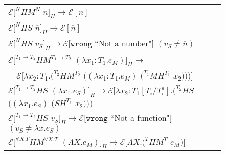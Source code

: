 \begin{figure}[p]
\centering
\begin{tabular}{l}
\vspace{5pt}

$\mathscr{E}[^{N}HM^{N}$ $\overline{n}]_{H}\rightarrow\mathscr{E}[\overline{n}]$ \\

\vspace{5pt}

$\mathscr{E}[^{N}HS$ $\overline{n}]_{H}\rightarrow\mathscr{E}[\overline{n}]$ \\

\vspace{5pt}

$\mathscr{E}[^{N}HS$ $v_{S}]_{H}\rightarrow\mathscr{E}[\mathtt{wrong}$ ``Not a number"$]$ $(v_{S}\neq\overline{n})$ \\

\vspace{5pt}

$\mathscr{E}[^{T_{1}\rightarrow T_{2}}HM^{T_{1}\rightarrow T_{2}}$ $(\lambda x_{1}:T_{1}.e_{M})]_{H}\rightarrow$ \\

\vspace{5pt}

$\quad\mathscr{E}[\lambda x_{2}:T_{1}.(^{T_{2}}HM^{T_{2}}$ $((\lambda x_{1}:T_{1}.e_{M})$ $(^{T_{1}}MH^{T_{1}}$ $x_{2})))]$ \\

\vspace{5pt}

$\mathscr{E}[^{T_{1}\rightarrow T_{2}}HS$ $(\lambda x_{1}.e_{S})]_{H}\rightarrow\mathscr{E}[\lambda x_{2}:T_{1}[T_{i}/T^{a}_{i}].(^{T_{2}}HS$ $((\lambda x_{1}.e_{S})$ $(SH^{T_{1}}$ $x_{2})))]$ \\

\vspace{5pt}

$\mathscr{E}[^{T_{1}\rightarrow T_{2}}HS$ $v_{S}]_{H}\rightarrow\mathscr{E}[\mathtt{wrong}$ ``Not a function"$]$ $(v_{S}\neq\lambda x.e_{S})$ \\

\vspace{5pt}

$\mathscr{E}[^{\forall X.T}HM^{\forall X.T}$ $(\Lambda X.e_{M})]_{H}\rightarrow\mathscr{E}[\Lambda X.(^{T}HM^{T}$ $e_{M})]$ \\


\end{tabular}
\end{figure}
